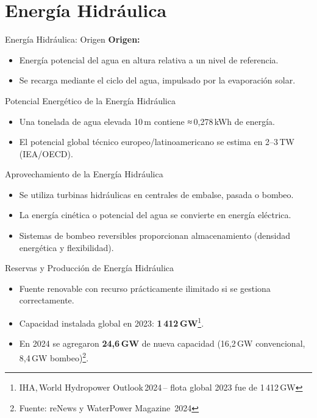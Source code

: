 \documentclass[main.tex]{subfiles}
\begin{document}
\section{Energía Hidráulica}
\begin{frame}{Energía Hidráulica: Origen}
    \textbf{Origen:}
    \begin{itemize}
        \item Energía potencial del agua en altura relativa a un nivel de referencia.
        \item Se recarga mediante el ciclo del agua, impulsado por la evaporación solar.
    \end{itemize}
\end{frame}


\begin{frame}{Potencial Energético de la Energía Hidráulica}
    \begin{itemize}
        \item Una tonelada de agua elevada 10 m contiene ≈ 0,278 kWh de energía.
        \item El potencial global técnico europeo/latinoamericano se estima en 2–3 TW (IEA/OECD).
    \end{itemize}
\end{frame}


\begin{frame}{Aprovechamiento de la Energía Hidráulica}
    \begin{itemize}
        \item Se utiliza turbinas hidráulicas en centrales de embalse, pasada o bombeo.
        \item La energía cinética o potencial del agua se convierte en energía eléctrica.
        \item Sistemas de bombeo reversibles proporcionan almacenamiento (densidad energética y flexibilidad).
    \end{itemize}
\end{frame}


\begin{frame}{Reservas y Producción de Energía Hidráulica}
    \begin{itemize}
        \item Fuente renovable con recurso prácticamente ilimitado si se gestiona correctamente.
        \item Capacidad instalada global en 2023: \textbf{1 412 GW}\footnote{IHA, World Hydropower Outlook 2024 – flota global 2023 fue de 1 412 GW}.
        \item En 2024 se agregaron \textbf{24,6 GW} de nueva capacidad (16,2 GW convencional, 8,4 GW bombeo)\footnote{Fuente: reNews y WaterPower Magazine 2024}.
    \end{itemize}
\end{frame}
\end{document}
